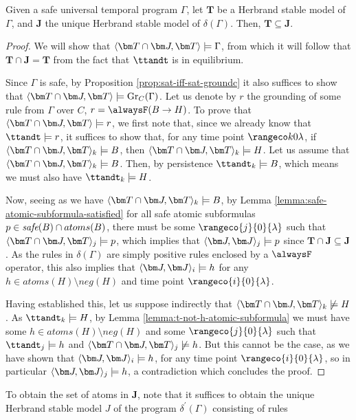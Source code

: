 \begin{proposition}\label{prop:simplified-facts}
  Given a safe universal temporal program $\Gamma$, let $\bm{T}$ be a
  Herbrand stable model of $\Gamma$, and $\bm{J}$ the unique Herbrand
  stable model of $\delta(\Gamma)$. Then, $\bm{T} \subseteq \bm{J}$.
\end{proposition}
\begin{proof} We will show that $\ttjandt \models \Gamma$, from which
  it will follow that $\bm{T} \cap \bm{J} = \bm{T}$ from the fact that
  $\ttandt$ is in equilibrium.

  Since $\Gamma$ is safe, by Proposition
  \ref{prop:sat-iff-sat-groundc} it also suffices to show that
  $\ttjandt \models \ground{C}{\Gamma}$. Let us
  denote by $r$ the grounding of some rule from $\Gamma$ over $C$,
  $r = \tempruleshort$. To prove that $\ttjandt \models r$, we first
  note that, since we already know that $\ttandt \models r$, it
  suffices to show that, for any time point $\kinlambda$, if
  $\ttjandt_k \models B$, then $\ttjandt_k \models H$. Let us assume
  that $\ttjandt_k \models B$. Then, by persistence
  $\ttandt_k \models B$, which means we must also have
  $\ttandt_k \models H$.

  Now, seeing as we have $\ttjandt_k \models B$, by Lemma
  \ref{lemma:safe-atomic-subformula-satisfied} for all safe atomic
  subformulas $p \in \textit{safe}(B) \cap atoms(B)$, there must be some
  $\rangeco{j}{0}{\lambda}$ such that $\ttjandt_j \models p$, which
  implies that $\tjandj_j \models p$ since
  $\bm{T} \cap \bm{J} \subseteq \bm{J}$. As the rules in
  $\delta(\Gamma)$ are simply positive rules enclosed by a $\alwaysF$
  operator, this also implies that $\tjandj_i \models h$ for any
  $h \in atoms(H) \setminus neg(H)$ and time point $\rangeco{i}{0}{\lambda}$.

  Having established this, let us suppose indirectly that
  $\ttjandt_k \not\models H$. As $\ttandt_k \models H$, by Lemma
  \ref{lemma:t-not-h-atomic-subformula} we must have some
  $h \in atoms(H) \setminus neg(H)$ and some $\rangeco{j}{0}{\lambda}$ such that
  $\ttandt_j \models h$ and $\ttjandt_j \not\models h$. But this
  cannot be the case, as we have shown that $\tjandj_i \models h$, for
  any time point $\rangeco{i}{0}{\lambda}$, so in particular
  $\tjandj_j \models h$, a contradiction which concludes the proof.
\end{proof}

To obtain the set of atoms in $\bm{J}$, note that it suffices to
obtain the unique Herbrand stable model $J$ of the program
$\delta^{\prime}(\Gamma)$ consisting of rules

